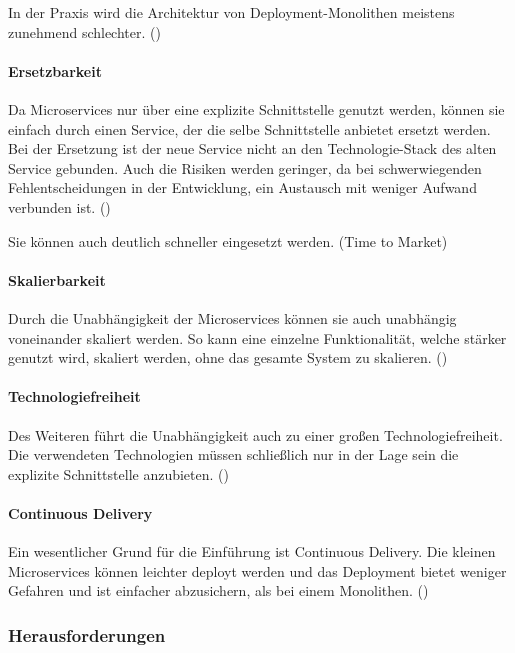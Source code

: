 In der Praxis wird die Architektur von Deployment-Monolithen meistens zunehmend schlechter. (\cite[S. 3]{wolffMicroservices2018})

\paragraph{Ersetzbarkeit}
Da Microservices nur über eine explizite Schnittstelle genutzt werden, können sie einfach durch einen Service, der die selbe Schnittstelle anbietet ersetzt werden. Bei der Ersetzung ist der neue Service nicht an den Technologie-Stack des alten Service gebunden. Auch die Risiken werden geringer, da bei schwerwiegenden Fehlentscheidungen in der Entwicklung, ein Austausch mit weniger Aufwand verbunden ist. (\cite[S. 4]{wolffMicroservices2018})

Sie können auch deutlich schneller eingesetzt werden. (Time to Market)

\paragraph{Skalierbarkeit}
Durch die Unabhängigkeit der Microservices können sie auch unabhängig voneinander skaliert werden. So kann eine einzelne Funktionalität, welche stärker genutzt wird, skaliert werden, ohne das gesamte System zu skalieren. (\cite[S. 5]{wolffMicroservices2018})

\paragraph{Technologiefreiheit}

Des Weiteren führt die Unabhängigkeit auch zu einer großen Technologiefreiheit. Die verwendeten Technologien müssen schließlich nur in der Lage sein die explizite Schnittstelle anzubieten. (\cite[S. 5]{wolffMicroservices2018})

\paragraph{Continuous Delivery}

Ein wesentlicher Grund für die Einführung ist Continuous Delivery. Die kleinen Microservices können leichter deployt werden und das Deployment bietet weniger Gefahren und ist einfacher abzusichern, als bei einem Monolithen. (\cite[S. 5]{wolffMicroservices2018})

\subsubsection{Herausforderungen}

